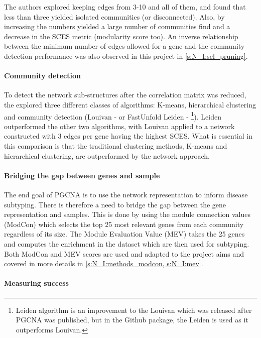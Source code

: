 The authors explored keeping edges from 3-10 and all of them, and found that less than three yielded isolated communities (or disconnected). Also, by increasing the numbers yielded a large number of communities find and a decrease in the SCES metric (modularity score too). An inverse relationship between the minimum number of edges allowed for a gene and the community detection performance was also observed in this project in \cref{s:N_I:sel_pruning}.

\paragraph*{Community detection}

To detect the network sub-structures after the correlation matrix was reduced, the \citet{Care2019-ij} explored three different classes of algorithms: K-means, hierarchical clustering and community detection (Louivan - \cite{Blondel2008-ik} or FastUnfold Leiden - \cite{Traag2019-ne}\footnote{Leiden algorithm is an improvement to the Louivan which was released after PGCNA was published, but in the Github package, the Leiden is used as it outperforms Louivan.}). Leiden outperformed the other two algorithms, with Louivan applied to a network constructed with 3 edges per gene having the highest SCES. What is essential in this comparison is that the traditional clustering methods, K-means and hierarchical clustering, are outperformed by the network approach.

\paragraph*{Bridging the gap between genes and sample}

The end goal of PGCNA is to use the network representation to inform disease subtyping. There is therefore a need to bridge the gap between the gene representation and samples. This is done by using the module connection values (ModCon) which selects the top 25 most relevant genes from each community regardless of its size. The Module Evaluation Value (MEV) takes the 25 genes and computes the enrichment in the dataset which are then used for subtyping. Both ModCon and MEV scores are used and adapted to the project aims and covered in more details in \cref{s:N_I:methods_modcon, s:N_I:mev}.

\paragraph*{Measuring success} 

